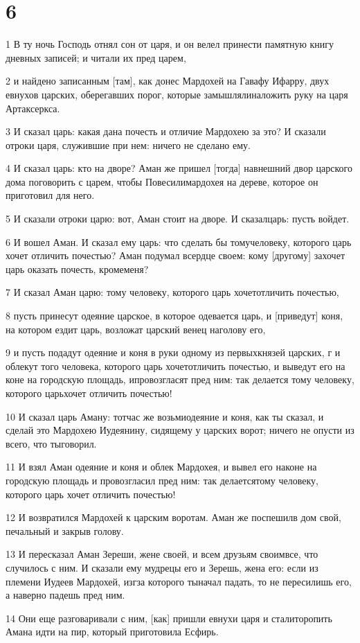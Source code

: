 \chapter{6}

\par 1 В ту ночь Господь отнял сон от царя, и он велел принести памятную книгу дневных записей; и читали их пред царем,
\par 2 и найдено записанным [там], как донес Мардохей на Гавафу Ифарру, двух евнухов царских, оберегавших порог, которые замышлялиналожить руку на царя Артаксеркса.
\par 3 И сказал царь: какая дана почесть и отличие Мардохею за это? И сказали отроки царя, служившие при нем: ничего не сделано ему.
\par 4 И сказал царь: кто на дворе? Аман же пришел [тогда] навнешний двор царского дома поговорить с царем, чтобы Повесилимардохея на дереве, которое он приготовил для него.
\par 5 И сказали отроки царю: вот, Аман стоит на дворе. И сказалцарь: пусть войдет.
\par 6 И вошел Аман. И сказал ему царь: что сделать бы томучеловеку, которого царь хочет отличить почестью? Аман подумал всердце своем: кому [другому] захочет царь оказать почесть, кромеменя?
\par 7 И сказал Аман царю: тому человеку, которого царь хочетотличить почестью,
\par 8 пусть принесут одеяние царское, в которое одевается царь, и [приведут] коня, на котором ездит царь, возложат царский венец наголову его,
\par 9 и пусть подадут одеяние и коня в руки одному из первыхкнязей царских, г и облекут того человека, которого царь хочетотличить почестью, и выведут его на коне на городскую площадь, ипровозгласят пред ним: так делается тому человеку, которого царьхочет отличить почестью!
\par 10 И сказал царь Аману: тотчас же возьмиодеяние и коня, как ты сказал, и сделай это Мардохею Иудеянину, сидящему у царских ворот; ничего не опусти из всего, что тыговорил.
\par 11 И взял Аман одеяние и коня и облек Мардохея, и вывел его наконе на городскую площадь и провозгласил пред ним: так делаетсятому человеку, которого царь хочет отличить почестью!
\par 12 И возвратился Мардохей к царским воротам. Аман же поспешилв дом свой, печальный и закрыв голову.
\par 13 И пересказал Аман Зереши, жене своей, и всем друзьям своимвсе, что случилось с ним. И сказали ему мудрецы его и Зерешь, жена его: если из племени Иудеев Мардохей, изгза которого тыначал падать, то не пересилишь его, а наверно падешь пред ним.
\par 14 Они еще разговаривали с ним, [как] пришли евнухи царя и сталиторопить Амана идти на пир, который приготовила Есфирь.

